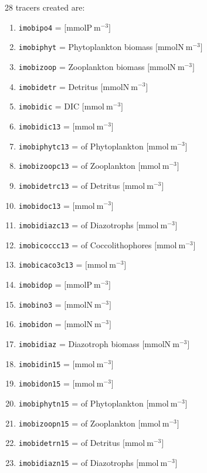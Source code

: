 \documentclass[a4paper]{article}
\begin{document}
\begin{enumerate}
28 tracers created are:
\begin{enumerate}[label=(\arabic*)]
	\item \verb|imobipo4| =  $[\mathrm{mmolP \ m^{-3}]}$
	\item \verb|imobiphyt| = Phytoplankton biomass $[\mathrm{mmolN \ m^{-3}]}$
	\item \verb|imobizoop| = Zooplankton biomass $[\mathrm{mmolN \ m^{-3}]}$
	\item \verb|imobidetr| = Detritus $[\mathrm{mmolN \ m^{-3}]}$
	\item \verb|imobidic| = DIC $[\mathrm{mmol \ m^{-3}]}$	
	\item \verb|imobidic13| =  $[\mathrm{mmol \ m^{-3}]}$	
	\item \verb|imobiphytc13| =  of Phytoplankton $[\mathrm{mmol \ m^{-3}]}$	
	\item \verb|imobizoopc13| =  of Zooplankton $[\mathrm{mmol \ m^{-3}]}$	
	\item \verb|imobidetrc13| =  of Detritus $[\mathrm{mmol \ m^{-3}]}$	
	\item \verb|imobidoc13| =  $[\mathrm{mmol \ m^{-3}]}$	
	\item \verb|imobidiazc13| =  of Diazotrophs $[\mathrm{mmol \ m^{-3}]}$		
	\item \verb|imobicoccc13| =  of Coccolithophores $[\mathrm{mmol \ m^{-3}]}$	
	\item \verb|imobicaco3c13| =  $[\mathrm{mmol \ m^{-3}]}$	
	\item \verb|imobidop| =  $[\mathrm{mmolP \ m^{-3}]}$
	\item \verb|imobino3| =  $[\mathrm{mmolN \ m^{-3}]}$
	\item \verb|imobidon| =  $[\mathrm{mmolN \ m^{-3}]}$	
	\item \verb|imobidiaz| = Diazotroph biomass $[\mathrm{mmolN \ m^{-3}]}$
	\item \verb|imobidin15| =  $[\mathrm{mmol \ m^{-3}]}$	
	\item \verb|imobidon15| =  $[\mathrm{mmol \ m^{-3}]}$	
	\item \verb|imobiphytn15| =  of Phytoplankton $[\mathrm{mmol \ m^{-3}]}$	
	\item \verb|imobizoopn15| =  of Zooplankton $[\mathrm{mmol \ m^{-3}]}$	
	\item \verb|imobidetrn15| =  of Detritus $[\mathrm{mmol \ m^{-3}]}$		
	\item \verb|imobidiazn15| =  of Diazotrophs $[\mathrm{mmol \ m^{-3}]}$	

\end{enumerate}
\end{enumerate}
\end{document}
